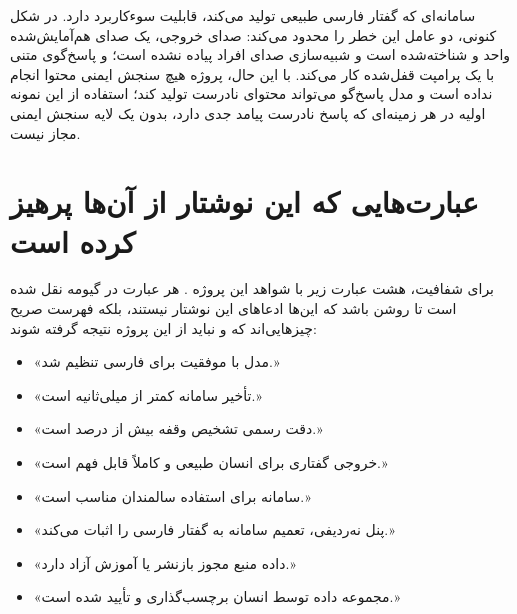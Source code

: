 سامانه‌ای که گفتار فارسی طبیعی تولید می‌کند، قابلیت سوءکاربرد دارد. در
شکل کنونی، دو عامل این خطر را محدود می‌کند: صدای خروجی، یک صدای
هم‌آمایش‌شده واحد و شناخته‌شده است و شبیه‌سازی صدای افراد پیاده نشده است؛
و پاسخ‌گوی متنی با یک پرامپت قفل‌شده کار می‌کند. با این حال، پروژه هیچ
سنجش ایمنی محتوا انجام نداده است و مدل پاسخ‌گو می‌تواند محتوای نادرست
تولید کند؛ استفاده از این نمونه اولیه در هر زمینه‌ای که پاسخ نادرست
پیامد جدی دارد، بدون یک لایه سنجش ایمنی مجاز نیست.

\section{عبارت‌هایی که این نوشتار از آن‌ها پرهیز کرده است}
\label{sec:forbidden}

برای شفافیت، هشت عبارت زیر با شواهد این پروژه . هر
عبارت در گیومه نقل شده است تا روشن باشد که این‌ها ادعاهای این نوشتار
نیستند، بلکه فهرست صریح چیزهایی‌اند که  و نباید از این
پروژه نتیجه گرفته شوند:

\begin{itemize}
\item «مدل  با موفقیت برای فارسی تنظیم شد.»
\item «تأخیر سامانه کمتر از  میلی‌ثانیه است.»
\item «دقت رسمی تشخیص وقفه بیش از  درصد است.»
\item «خروجی گفتاری برای انسان طبیعی و کاملاً قابل فهم است.»
\item «سامانه برای استفاده سالمندان مناسب است.»
\item «پنل نه‌ردیفی، تعمیم سامانه به گفتار فارسی را اثبات می‌کند.»
\item «داده منبع مجوز بازنشر یا آموزش آزاد دارد.»
\item «مجموعه داده توسط انسان برچسب‌گذاری و تأیید شده است.»
\end{itemize}
